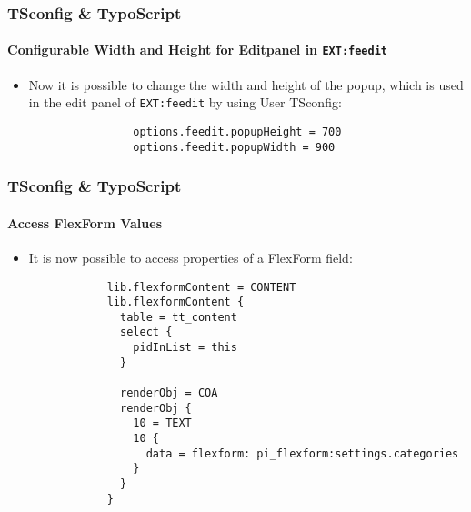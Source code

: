 \begin{frame}[fragile]
	\frametitle{TSconfig \& TypoScript}
	\framesubtitle{Configurable Width and Height for Editpanel in \texttt{EXT:feedit}}

	\lstset{basicstyle=\small\ttfamily}

	\begin{itemize}

		\item Now it is possible to change the width and height of the popup, which is used in the
			edit panel of \texttt{EXT:feedit} by using User TSconfig:
			\begin{lstlisting}
				options.feedit.popupHeight = 700
				options.feedit.popupWidth = 900
			\end{lstlisting}

	\end{itemize}

\end{frame}

\begin{frame}[fragile]
	\frametitle{TSconfig \& TypoScript}
	\framesubtitle{Access FlexForm Values}

	\lstset{basicstyle=\tiny\ttfamily}

	\begin{itemize}

		\item It is now possible to access properties of a FlexForm field:

		\begin{lstlisting}
			lib.flexformContent = CONTENT
			lib.flexformContent {
			  table = tt_content
			  select {
			    pidInList = this
			  }

			  renderObj = COA
			  renderObj {
			    10 = TEXT
			    10 {
			      data = flexform: pi_flexform:settings.categories
			    }
			  }
			}
		\end{lstlisting}

	\end{itemize}

\end{frame}

